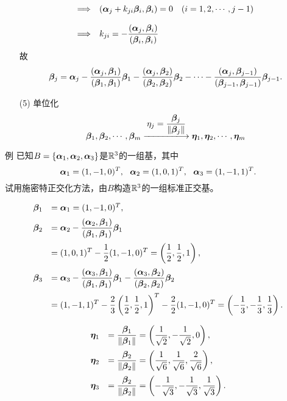 \begin{dingyi}
\begin{itemize}
$$\begin{array}{rl}
      \Longrightarrow &(\boldsymbol{\alpha}_j+k_{ji}\boldsymbol{\beta}_i,\boldsymbol{\beta}_i)=0 \quad (i=1,2,\cdots,j-1)\\[0.4cm] 
      \Longrightarrow& \displaystyle k_{ji}=-\frac{(\boldsymbol{\alpha}_j,\boldsymbol{\beta}_i)}{(\boldsymbol{\beta}_i,\boldsymbol{\beta}_i)} 
    \end{array}
    $$
    故
    $$
    \boldsymbol{\beta}_j=\boldsymbol{\alpha}_j-\frac{(\boldsymbol{\alpha}_j,\boldsymbol{\beta}_1)}{(\boldsymbol{\beta}_1,\boldsymbol{\beta}_1)}\boldsymbol{\beta}_1
    -\frac{(\boldsymbol{\alpha}_j,\boldsymbol{\beta}_2)}{(\boldsymbol{\beta}_2,\boldsymbol{\beta}_2)}\boldsymbol{\beta}_2
    -\cdots
    -\frac{(\boldsymbol{\alpha}_j,\boldsymbol{\beta}_{j-1})}{(\boldsymbol{\beta}_{j-1},\boldsymbol{\beta}_{j-1})}\boldsymbol{\beta}_{j-1}.
    $$
  \item[(5)] 单位化
    $$
    \betabd_1, \betabd_2, \cd, \betabd_m \xlongrightarrow[]{\ds \eta_j=\frac{\betabd_j}{\|\betabd_j\|}}
    \etabd_1, \etabd_2, \cd, \etabd_m
    $$
  \end{itemize}
\end{dingyi}






\begin{li}{例}
  已知$B=\{\boldsymbol{\alpha}_1,\boldsymbol{\alpha}_2,\boldsymbol{\alpha}_3\}$是$\mathbb R^3$的一组基，其中
  $$
  \boldsymbol{\alpha}_1=(1,-1,0)^T,~~
  \boldsymbol{\alpha}_2=(1,0,1)^T,~~
  \boldsymbol{\alpha}_3=(1,-1,1)^T.
  $$
  试用施密特正交化方法，由$B$构造$\mathbb R^3$的一组标准正交基。
\end{li}
\begin{jie}
$$
\begin{array}{rl}
  \boldsymbol{\beta}_1&=\boldsymbol{\alpha}_1=(1,-1,0)^T, \\[0.2cm]
  \boldsymbol{\beta}_2&\displaystyle=\boldsymbol{\alpha}_2-\frac{(\boldsymbol{\alpha}_2,\boldsymbol{\beta}_1)}{(\boldsymbol{\beta}_1,\boldsymbol{\beta}_1)}\boldsymbol{\beta}_1\\[0.4cm]
           &\displaystyle=(1,0,1)^T-\frac12(1,-1,0)^T=\left(\frac12,\frac12,1\right),\\[0.4cm]
  \boldsymbol{\beta}_3&\displaystyle=\boldsymbol{\alpha}_3-\frac{(\boldsymbol{\alpha}_3,\boldsymbol{\beta}_1)}{(\boldsymbol{\beta}_1,\boldsymbol{\beta}_1)}\boldsymbol{\beta}_1
             -\frac{(\boldsymbol{\alpha}_3,\boldsymbol{\beta}_2)}{(\boldsymbol{\beta}_2,\boldsymbol{\beta}_2)}\boldsymbol{\beta}_2\\[0.4cm]
           &\displaystyle=(1,-1,1)^T-\frac23\left(\frac12,\frac12,1\right)^T-\frac22(1,-1,0)^T=\left(-\frac13,-\frac13,\frac13\right).
\end{array}
$$






$$
\begin{array}{rl}
  \boldsymbol{\eta}_1&\displaystyle =\frac{\boldsymbol{\beta}_1}{\|\boldsymbol{\beta}_1\|}=\left(\frac1{\sqrt{2}},-\frac1{\sqrt{2}},0\right),\\[0.4cm]
  \boldsymbol{\eta}_2&\displaystyle =\frac{\boldsymbol{\beta}_2}{\|\boldsymbol{\beta}_2\|}=\left(\frac1{\sqrt{6}},\frac1{\sqrt{6}},\frac2{\sqrt{6}}\right),\\[0.4cm]
  \boldsymbol{\eta}_3&\displaystyle =\frac{\boldsymbol{\beta}_2}{\|\boldsymbol{\beta}_2\|}=\left(-\frac1{\sqrt{3}},-\frac1{\sqrt{3}},\frac1{\sqrt{3}}\right).
\end{array}
$$
\end{jie}


